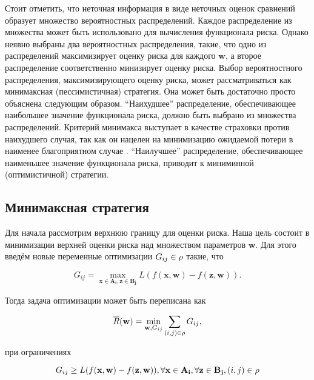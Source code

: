 \documentclass[12pt,a4paper,oneside]{article}
\begin{document}
\par
Стоит отметить, что неточная информация в виде неточных оценок сравнений образует множество вероятностных распределений. 
Каждое распределение из множества может быть использовано для вычисления функционала риска.
Однако неявно выбраны два вероятностных распределения, такие, что одно из распределений максимизирует оценку риска для каждого \(\mathbf{w}\), а второе распределение соответственно минизирует оценку риска. 
Выбор вероятностного распределения, максимизирующего оценку риска, может рассматриваться как минимаксная (пессимистичная) стратегия. 
Она может быть достаточно просто объяснена следующим образом. 
``Наихудшее'' распределение, обеспечивающее наибольшее значение функционала риска, должно быть выбрано из множества распределений. 
Критерий минимакса выступает в качестве страховки против наихудшего случая, так как он нацелен на минимизацию ожидаемой потери в наименее благоприятном случае . 
``Наилучшее'' распределение, обеспечивающее наименьшее значение функционала риска, приводит к миниминной (оптимистичной) стратегии.


\subsection{Минимаксная стратегия}

\par
Для начала рассмотрим верхнюю границу для оценки риска. 
Наша цель состоит в минимизации верхней оценки риска над множеством параметров \(\mathbf{w}\). 
Для этого введём новые переменные оптимизации \(G_{ij} \in \mathrm{\rho}\) такие, что

\[
G_{ij} = \underset{\mathbf{x} \in \mathbf{A_i}, \mathbf{z} \in \mathbf{B_j}}{\operatorname{max}} L (f (\mathbf{x}, \mathbf{w}) - f(\mathbf{z}, \mathbf{w})). 
\]

\par
Тогда задача оптимизации может быть переписана как

\[
\overline{R}(\mathbf{w}) = \underset{\mathbf{w}, G_{ij}}{\operatorname{min}} \sum \limits_{(i, j) \in \mathrm{\rho}} G_{ij},
\]

\par
при ограничениях

\[
G_{ij} \geq L (f(\mathbf{x}, \mathbf{w}) - f(\mathbf{z}, \mathbf{w})), \forall \mathbf{x} \in \mathbf{A_i}, \forall \mathbf{z} \in \mathbf{B_j}, (i, j) \in \mathrm{\rho}
\]
\end{document}
